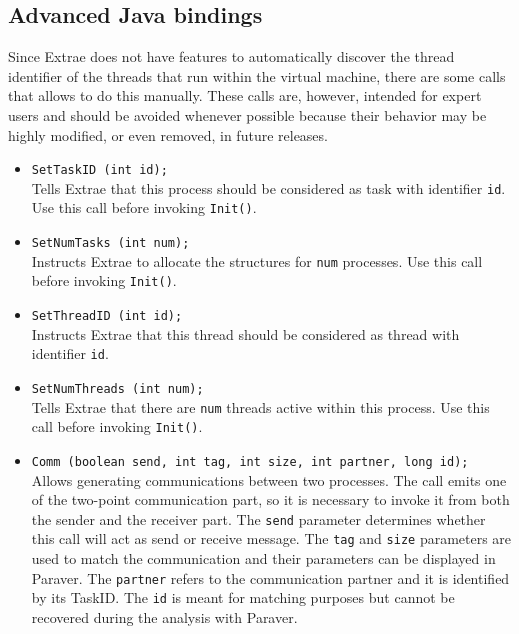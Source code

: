 \subsection{Advanced Java bindings}\label{subsec:AdvancedJavaBindings}

Since Extrae does not have features to automatically discover the thread identifier of the threads that run within the virtual machine, there are some calls that allows to do this manually.
These calls are, however, intended for expert users and should be avoided whenever possible because their behavior may be highly modified, or even removed, in future releases.

\begin{itemize}

  \item {\texttt{SetTaskID (int id);}}\\
  Tells Extrae that this process should be considered as task with identifier \texttt{id}. Use this call before invoking \texttt{Init()}.

  \item {\texttt{SetNumTasks (int num);}}\\
  Instructs Extrae to allocate the structures for \texttt{num} processes. Use this call before invoking \texttt{Init()}.
%
  \item {\texttt{SetThreadID (int id);}}\\
  Instructs Extrae that this thread should be considered as thread with identifier \texttt{id}.

  \item {\texttt{SetNumThreads (int num);}}\\
  Tells Extrae that there are \texttt{num} threads active within this process. Use this call before invoking \texttt{Init()}.

  \item {\texttt{Comm (boolean send, int tag, int size, int partner, long id);}}\\
  Allows generating communications between two processes. The call emits one of the two-point communication part, so it is necessary to invoke it from both the sender and the receiver part. The \texttt{send} parameter determines whether this call will act as send or receive message. The \texttt{tag} and \texttt{size} parameters are used to match the communication and their parameters can be displayed in Paraver. The \texttt{partner} refers to the communication partner and it is identified by its TaskID. The \texttt{id} is meant for matching purposes but cannot be recovered during the analysis with Paraver.

\end{itemize}

